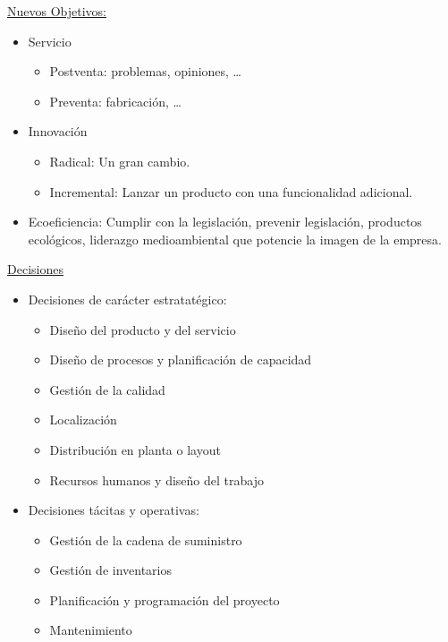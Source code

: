 \documentclass[12pt]{book} %
\providecommand{\tightlist}{%
  \setlength{\itemsep}{0pt}\setlength{\parskip}{0pt}}
\begin{document}
\underline{Nuevos Objetivos:}

\begin{itemize}
\tightlist
\item
  Servicio

  \begin{itemize}
  \tightlist
  \item
    Postventa: problemas, opiniones, \ldots{}
  \item
    Preventa: fabricación, \ldots{}
  \end{itemize}
\item
  Innovación

  \begin{itemize}
  \tightlist
  \item
    Radical: Un gran cambio.
  \item
    Incremental: Lanzar un producto con una funcionalidad adicional.
  \end{itemize}
\item
  Ecoeficiencia: Cumplir con la legislación, prevenir legislación,
  productos ecológicos, liderazgo medioambiental que potencie la imagen
  de la empresa.
\end{itemize}

\underline{Decisiones}

\begin{itemize}
\tightlist
\item
  Decisiones de carácter estratatégico:

  \begin{itemize}
  \tightlist
  \item
    Diseño del producto y del servicio\\
  \item
    Diseño de procesos y planificación de capacidad\\
  \item
    Gestión de la calidad\\
  \item
    Localización\\
  \item
    Distribución en planta o layout\\
  \item
    Recursos humanos y diseño del trabajo\\
  \end{itemize}
\item
  Decisiones tácitas y operativas:

  \begin{itemize}
  \tightlist
  \item
    Gestión de la cadena de suministro\\
  \item
    Gestión de inventarios\\
  \item
    Planificación y programación del proyecto\\
  \item
    Mantenimiento
  \end{itemize}
\end{itemize}
\end{document}
